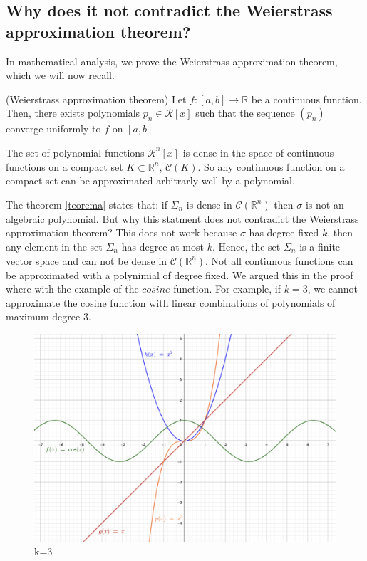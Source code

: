 \documentclass[../main.tex]{subfiles}
\begin{document}
\subsection{Why does it not contradict the Weierstrass approximation theorem? }

\noindent In mathematical analysis, we prove the Weierstrass approximation theorem, which we will now recall. 
\begin{theorem}(Weierstrass  approximation theorem)
	Let $f:[a,b]\rightarrow \mathbb{R} $ be a continuous function. Then, there exists polynomials $p_n\in \mathcal{R}[x]$ such that the sequence $(p_n)$ converge uniformly to $f$ on $[a,b]$. 
\end{theorem} 

\begin{corolari}
	The set of polynomial functions $\mathcal{R}^n[x]$ is dense in the space of continuous functions on a compact set $K \subset \mathbb{R}^n$, $\mathcal{C}(K)$. So any continuous function on a compact set can be approximated arbitrarly well by a polynomial. 
\end{corolari}

\noindent The theorem \ref{teorema} states that: if $\Sigma_n$ is dense in $\mathcal{C}(\mathbb{R}^n)$ then $\sigma$ is not an algebraic polynomial. But why this statment does not contradict the Weierstrass approximation theorem?
This does not work because $\sigma$ has degree fixed $k$, then any element in the set $\Sigma_n$ has degree at most $k$. Hence, the set $\Sigma_n$ is a finite vector space and can not be dense in $\mathcal{C}(\mathbb{R}^n)$. Not all contiunous functions can be approximated with a polynimial of degree fixed. We argued this in the proof where with the example of the $cosine$ function. For example, if $k=3$, we cannot approximate the cosine function with linear combinations of polynomials of maximum degree 3.

\begin{figure}[h]
	\centering
	\includegraphics[width=0.6\linewidth]{imgs/cos.png}
	\caption{\small k=3} 
\end{figure} \mbox{} \par
\end{document}
